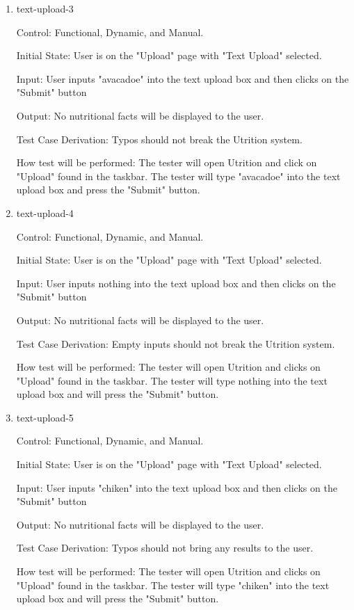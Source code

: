 \documentclass[12pt, titlepage]{article}
\begin{document}
\begin{enumerate}
	\item{text-upload-3\\}
	
	Control: Functional, Dynamic, and Manual.
	
	Initial State: User is on the "Upload" page with "Text Upload" selected.
	
	Input: User inputs "avacadoe" into the text upload box and then clicks on the "Submit" button
	
	Output: No nutritional facts will be displayed to the user.
	
	Test Case Derivation: Typos should not break the Utrition system.
	
	How test will be performed: The tester will open Utrition and click on "Upload" found in the taskbar. The tester will type "avacadoe" into the text upload box and press the "Submit" button.
	
	\item{text-upload-4\\}
	
	Control: Functional, Dynamic, and Manual.
	
	Initial State: User is on the "Upload" page with "Text Upload" selected.
	
	Input: User inputs nothing into the text upload box and then clicks on the "Submit" button
	
	Output: No nutritional facts will be displayed to the user.
	
	Test Case Derivation: Empty inputs should not break the Utrition system.
	
	How test will be performed: The tester will open Utrition and clicks on "Upload" found in the taskbar. The tester will type nothing into the text upload box and will press the "Submit" button.
	
	\item{text-upload-5\\}
	
	Control: Functional, Dynamic, and Manual.
	
	Initial State: User is on the "Upload" page with "Text Upload" selected.
	
	Input: User inputs "chiken" into the text upload box and then clicks on the "Submit" button
	
	Output: No nutritional facts will be displayed to the user.
	
	Test Case Derivation: Typos should not bring any results to the user.
	
	How test will be performed: The tester will open Utrition and clicks on "Upload" found in the taskbar. The tester will type "chiken" into the text upload box and will press the "Submit" button.
	

\end{enumerate}
\end{document}

